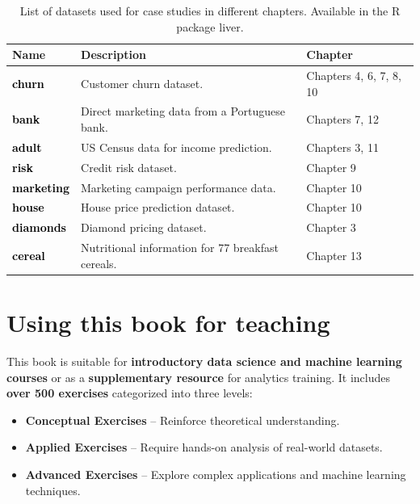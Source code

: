 \documentclass[
]{book}
\providecommand{\tightlist}{%
  \setlength{\itemsep}{0pt}\setlength{\parskip}{0pt}}
\theoremstyle{definition}
\theoremstyle{definition}
\theoremstyle{definition}
\theoremstyle{definition}
\theoremstyle{remark}
\begin{document}
\begin{table}
\centering
\caption{\label{tab:data-table}List of datasets used for case studies in different chapters. Available in the R package liver.}
\centering
\begin{tabular}[t]{>{}l>{\raggedright\arraybackslash}p{20em}l}
\toprule
Name & Description & Chapter\\
\midrule
\textcolor{black}{\textbf{churn}} & Customer churn dataset. & Chapters 4, 6, 7, 8, 10\\
\textcolor{black}{\textbf{bank}} & Direct marketing data from a Portuguese bank. & Chapters 7, 12\\
\textcolor{black}{\textbf{adult}} & US Census data for income prediction. & Chapters 3, 11\\
\textcolor{black}{\textbf{risk}} & Credit risk dataset. & Chapter 9\\
\textcolor{black}{\textbf{marketing}} & Marketing campaign performance data. & Chapter 10\\
\addlinespace
\textcolor{black}{\textbf{house}} & House price prediction dataset. & Chapter 10\\
\textcolor{black}{\textbf{diamonds}} & Diamond pricing dataset. & Chapter 3\\
\textcolor{black}{\textbf{cereal}} & Nutritional information for 77 breakfast cereals. & Chapter 13\\
\bottomrule
\end{tabular}
\end{table}

\section*{Using this book for teaching}\label{using-this-book-for-teaching}

This book is suitable for \textbf{introductory data science and machine learning courses} or as a \textbf{supplementary resource} for analytics training. It includes \textbf{over 500 exercises} categorized into three levels:

\begin{itemize}
\tightlist
\item
  \textbf{Conceptual Exercises} -- Reinforce theoretical understanding.\\
\item
  \textbf{Applied Exercises} -- Require hands-on analysis of real-world datasets.\\
\item
  \textbf{Advanced Exercises} -- Explore complex applications and machine learning techniques.
\end{itemize}
\end{document}
